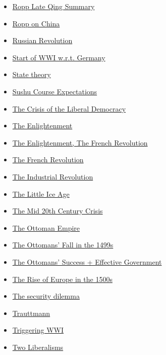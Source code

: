 \documentclass[11pt]{article}
\begin{document}
\begin{itemize}
\begin{itemize}
\begin{itemize}
\item \href{history/history10/KBe20hist201retRoppLateQingSummary.org}{Ropp Late Qing Summary}
\item \href{history/history10/KBxRoppChina.org}{Ropp on China}
\item \href{history/history10/KBhHIST201RussianRevolution.org}{Russian Revolution}
\item \href{history/history10/KBhHIST201WWIStartWRTGermany.org}{Start of WWI w.r.t. Germany}
\item \href{history/history10/KB20200827104601.org}{State theory}
\item \href{history/history10/KBhHIST201SushuCourseExpectation.org}{Sushu Course Expectations}
\item \href{history/history10/KBhHIST201CrisisOfLibDemo.org}{The Crisis of the Liberal Democracy}
\item \href{history/history10/KBhHIST201TheEnlightenment.org}{The Enlightenment}
\item \href{history/history10/KBhHIST201EnlightenmentFrenchRev.org}{The Enlightenment, The French Revolution}
\item \href{history/history10/KBhHIST201FrenchRevolution.org}{The French Revolution}
\item \href{history/history10/KBhHIST201IndustrialRevolution.org}{The Industrial Revolution}
\item \href{history/history10/KBhHIST201LittleIceAge.org}{The Little Ice Age}
\item \href{history/history10/KBhHIST201ColdWar.org}{The Mid 20th Century Crisis}
\item \href{history/history10/KBrefOttomanEmpire.org}{The Ottoman Empire}
\item \href{history/history10/KBhHIST201OttomansFall1500s.org}{The Ottomans' Fall in the 1499s}
\item \href{history/history10/KBhHIST201OttomansSuccess.org}{The Ottomans' Success + Effective Government}
\item \href{history/history10/KBhHIST201RiseOfEurope1500.org}{The Rise of Europe in the 1500s}
\item \href{history/history10/KBrefSecurityDilemma.org}{The security dilemma}
\item \href{history/history10/KBhHIST201Trauttmann.org}{Trauttmann}
\item \href{history/history10/KBhHIST201WWITriggering.org}{Triggering WWI}
\item \href{history/history10/KBhHIST201Liberalism.org}{Two Liberalisms}

\end{itemize}
\end{itemize}
\end{itemize}
\end{document}
